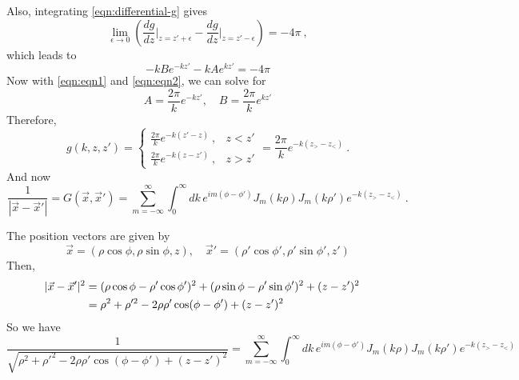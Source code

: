 \documentclass[12pt]{article}
\begin{document}
Also, integrating \eqref{eqn:differential-g} gives
\begin{equation}
   \lim_{\epsilon\to 0} \left(\frac{dg}{dz}\Bigg|_{z= z'+\epsilon} - \frac{dg}{dz}\Bigg|_{z= z'-\epsilon}\right) = - 4\pi~,
\end{equation}
which leads to
\begin{equation}\label{eqn:eqn2}
    -kB e^{-kz'} - kA e^{kz'} = -4\pi
\end{equation}
Now with \eqref{eqn:eqn1} and \eqref{eqn:eqn2}, we can solve for
\begin{equation}
    A = \frac{2\pi}{k} e^{-k z'}, \quad B = \frac{2\pi}{k} e^{k z'}
\end{equation}
Therefore,
\begin{equation}
    g(k,z,z')= \begin{cases}
        \frac{2\pi}{k} e^{-k(z' -z)}~, & z<z'\\
        \frac{2\pi}{k} e^{-k(z - z')}~, & z> z'
    \end{cases}
    =\frac{2\pi}{k} e^{-k(z_> - z_<)}~.
\end{equation}
And now
\begin{equation}
    \frac{1}{|\vec x - \vec x'|} = G(\vec x, \vec x') =\sum_{m = - \infty}^\infty \int_0^\infty dk\, e^{im(\phi - \phi')} J_m(k \rho) J_m(k \rho') e^{-k(z_> - z_<)}~.
\end{equation}

\newpage
{} The position vectors are given by
\begin{equation}
    \vec x = (\rho \cos \phi, \rho \sin \phi, z), \quad \vec x' = (\rho' \cos \phi', \rho' \sin\phi', z')
\end{equation}
Then,
\begin{align}
    |\vec x - \vec x'|^2 &= (\rho \cos\phi - \rho' \cos \phi')^2 + (\rho \sin \phi - \rho' \sin \phi')^2 + (z - z')^2 \cr
    &= \rho^2 + \rho'^2 - 2\rho \rho' \cos (\phi - \phi')+ (z-z')^2
\end{align}
So we have
\begin{equation}\nonumber
    \frac{1}{\sqrt{\rho^2 + \rho'^2 - 2\rho \rho' \cos (\phi - \phi')+ (z-z')^2}} = \sum_{m = - \infty}^\infty \int_0^\infty dk\, e^{im(\phi - \phi')} J_m(k \rho) J_m(k \rho') e^{-k(z_> - z_<)}
\end{equation}
\end{document}
